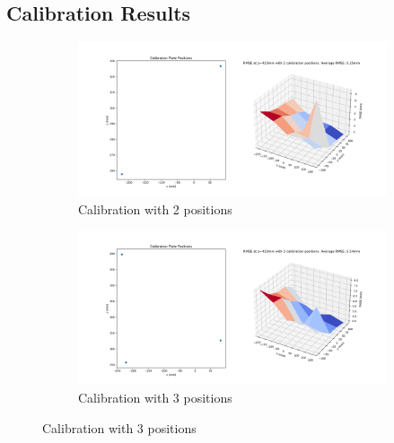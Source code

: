 \subsection{Calibration Results}

\begin{figure}
    \begin{subfigure}[b]{.45\linewidth}
        \includegraphics[width=\linewidth]{bilder/project/calibration_result_figures/calibration_accuracy_423mm_iter2.png}
        \caption{Calibration with 2 positions}\label{fig:423mm_iter2}
    \end{subfigure}
    \begin{subfigure}[b]{.45\linewidth}
        \includegraphics[width=\linewidth]{bilder/project/calibration_result_figures/calibration_accuracy_423mm_iter3.png}
        \caption{Calibration with 3 positions}\label{fig:423mm_iter3}
    \end{subfigure}



\end{figure}
